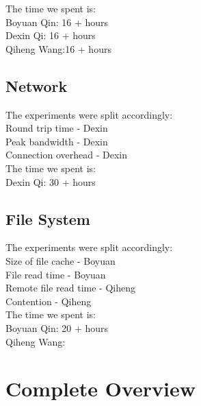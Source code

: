 \documentclass{article} %
\begin{document}
The time we spent is:\\
Boyuan Qin: 16 + hours\\
Dexin Qi: 16 + hours\\
Qiheng Wang:16 + hours

\subsection{Network}
The experiments were split accordingly:\\
Round trip time - Dexin\\
Peak bandwidth - Dexin\\
Connection overhead - Dexin\\

The time we spent is:\\
Dexin Qi: 30 + hours\\
\subsection{File System}
The experiments were split accordingly:\\
Size of file cache - Boyuan\\
File read time - Boyuan\\
Remote file read time - Qiheng \\
Contention - Qiheng\\

The time we spent is:\\
Boyuan Qin: 20 + hours\\
Qiheng Wang:

\section{Complete Overview}
\end{document}
